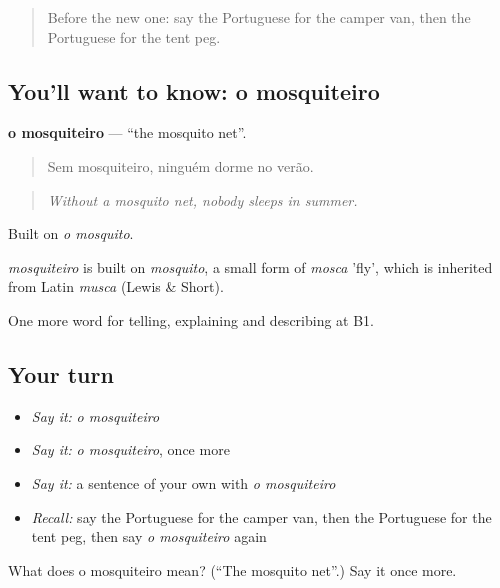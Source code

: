 \label{lesson:PT-C426-mosquiteiro}



\begin{quote}
Before the new one: say the Portuguese for the camper van, then the Portuguese for the tent peg.
\end{quote}

\subsection*{You'll want to know: o mosquiteiro}
\textbf{o mosquiteiro} — \textquotedblleft{}the mosquito net\textquotedblright{}.

\begin{quote}
Sem mosquiteiro, ninguém dorme no verão.
\end{quote}

\begin{quote}
\emph{Without a mosquito net, nobody sleeps in summer.}
\end{quote}

Built on \emph{o mosquito}.

\begin{cousinweb}
\emph{mosquiteiro} is built on \emph{mosquito}, a small form of \emph{mosca} 'fly', which is inherited from Latin \emph{musca} (Lewis \& Short).
\end{cousinweb}

\begin{grammarlens}[title={What you've built}]
One more word for telling, explaining and describing at B1.
\end{grammarlens}

\subsection*{Your turn}
\begin{itemize}
\raggedright
  \item \emph{Say it:} \emph{o mosquiteiro}
  \item \emph{Say it:} \emph{o mosquiteiro}, once more
  \item \emph{Say it:} a sentence of your own with \emph{o mosquiteiro}
  \item \emph{Recall:} say the Portuguese for the camper van, then the Portuguese for the tent peg, then say \emph{o mosquiteiro} again
\end{itemize}

\begin{tcolorbox}[breakable,colback=teal!4,colframe=teal!35!black,title={Before you move on}]
What does o mosquiteiro mean? (\textquotedblleft{}The mosquito net\textquotedblright{}.) Say it once more.
\end{tcolorbox}
